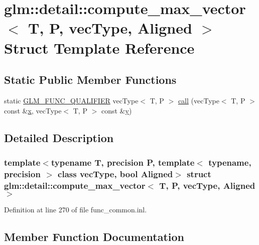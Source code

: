 \hypertarget{structglm_1_1detail_1_1compute__max__vector}{}\section{glm\+::detail\+::compute\+\_\+max\+\_\+vector$<$ T, P, vec\+Type, Aligned $>$ Struct Template Reference}
\label{structglm_1_1detail_1_1compute__max__vector}
\subsection*{Static Public Member Functions}
\begin{DoxyCompactItemize}
\item 
static \mbox{\hyperlink{setup_8hpp_a33fdea6f91c5f834105f7415e2a64407}{G\+L\+M\+\_\+\+F\+U\+N\+C\+\_\+\+Q\+U\+A\+L\+I\+F\+I\+ER}} vec\+Type$<$ T, P $>$ \mbox{\hyperlink{structglm_1_1detail_1_1compute__max__vector_ac3b94f18fd36a063d5915998d252b97f}{call}} (vec\+Type$<$ T, P $>$ const \&\mbox{\hyperlink{glad_8h_a92d0386e5c19fb81ea88c9f99644ab1d}{x}}, vec\+Type$<$ T, P $>$ const \&\mbox{\hyperlink{glad_8h_a66ddd433d2cacfe27f5906b7e86faeed}{y}})
\end{DoxyCompactItemize}


\subsection{Detailed Description}
\subsubsection*{template$<$typename T, precision P, template$<$ typename, precision $>$ class vec\+Type, bool Aligned$>$\newline
struct glm\+::detail\+::compute\+\_\+max\+\_\+vector$<$ T, P, vec\+Type, Aligned $>$}



Definition at line 270 of file func\+\_\+common.\+inl.



\subsection{Member Function Documentation}
\mbox{\label{structglm_1_1detail_1_1compute__max__vector_ac3b94f18fd36a063d5915998d252b97f}} 

